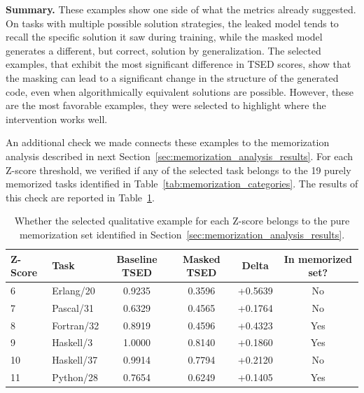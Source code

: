 \documentclass[mscthesis]{usiinfthesis}
\begin{document}
\textbf{Summary. }
 These examples show one side of what the metrics already suggested.
On tasks with multiple possible solution strategies, the leaked model tends to recall
the specific solution it saw during training, while the masked model generates a different, 
but correct, solution by generalization.
The selected examples, that exhibit the most significant difference in TSED scores,
show that the masking can lead to a significant change in the structure of the generated code,
even when algorithmically equivalent solutions are possible.
However, these are the most favorable examples, they were selected to highlight where the intervention
works well.
\par\vspace{1em}
An additional check we made connects these examples to the memorization analysis described in next Section~\ref{sec:memorization_analysis_results}.
For each Z-score threshold, we verified if any of the selected task belongs to the 19 purely memorized tasks identified in Table~\ref{tab:memorization_categories}.
The results of this check are reported in Table~\ref{tab:qualitative_memorized_check}.
\begin{table}[h]
\centering
\caption{Whether the selected qualitative example for each Z-score belongs to the
pure memorization set identified in Section~\ref{sec:memorization_analysis_results}.}
\label{tab:qualitative_memorized_check}
\begin{tabular}{llcccc}
\hline
\textbf{Z-Score} & \textbf{Task} & \textbf{Baseline TSED} & \textbf{Masked TSED} & \textbf{Delta} & \textbf{In memorized set?} \\
\hline
6  & Erlang/20   & 0.9235 & 0.3596 & +0.5639 & No  \\
7  & Pascal/31   & 0.6329 & 0.4565 & +0.1764 & No  \\
8  & Fortran/32  & 0.8919 & 0.4596 & +0.4323 & Yes \\
9  & Haskell/3   & 1.0000 & 0.8140 & +0.1860 & Yes \\
10 & Haskell/37  & 0.9914 & 0.7794 & +0.2120 & No  \\
11 & Python/28   & 0.7654 & 0.6249 & +0.1405 & Yes \\
\hline
\end{tabular}
\end{table}
\end{document}
